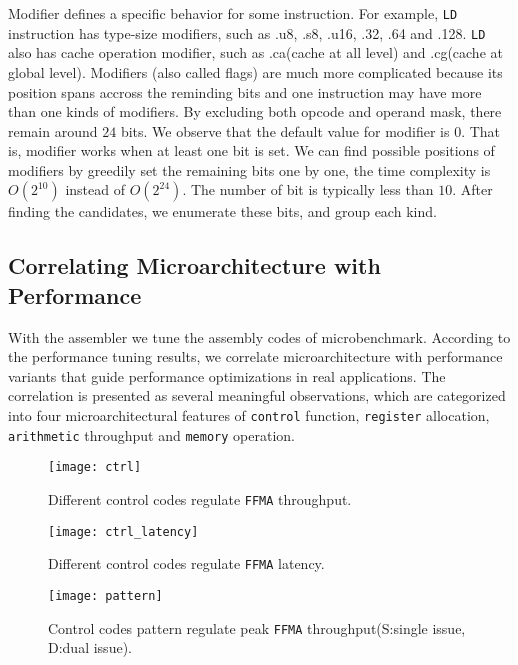 Modifier defines a specific behavior for some instruction. For example,
{\tt LD} instruction has type-size modifiers, such as .u8, .s8, .u16, .32, .64 and .128. {\tt LD} also has cache operation modifier, such as .ca(cache at all level) and .cg(cache at global level). Modifiers (also called flags) are much more complicated because its position spans accross the reminding bits and one instruction may have more than one kinds of modifiers. By excluding both opcode and operand mask, there remain around $24$ bits. We observe that the default value for modifier is $0$. That is, modifier works when at least one bit is set. We can find possible positions of modifiers 
by greedily set the remaining bits one by one, the time complexity is $O(2^{10})$ instead of $O(2^{24})$. The number of bit is typically less
than $10$. After finding the candidates, we enumerate these bits, and group each kind.

\subsection{Correlating Microarchitecture with Performance}
With the assembler we tune the assembly codes of microbenchmark. According to the performance tuning results, we correlate microarchitecture with performance variants that guide performance optimizations in real applications. The correlation is presented as several meaningful observations, which are categorized into four microarchitectural features of {\tt control} function, {\tt register} allocation, {\tt arithmetic} throughput and {\tt memory} operation.

\begin{figure}[htbp]
\begin{center}
\texttt{[image: ctrl]}
\caption{Different control codes regulate {\tt FFMA} throughput.}
\label{fig:control_throughput}
\end{center}
\end{figure}

\begin{figure}[htbp]
\begin{center}
\texttt{[image: ctrl\_latency]}
\caption{Different control codes regulate {\tt FFMA} latency.}
\label{fig:control_latency}
\end{center}
\end{figure}

\begin{figure}[htbp]
\begin{center}
\texttt{[image: pattern]}
    \caption{Control codes pattern regulate peak {\tt FFMA} throughput(S:single issue, D:dual issue).}
\label{fig:pattern}
\end{center}
\end{figure}

